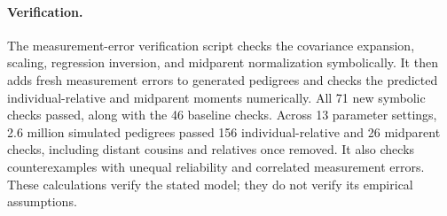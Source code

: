 \paragraph{Verification.}
The measurement-error verification script checks the covariance
expansion, scaling, regression inversion, and midparent normalization
symbolically. It then adds fresh measurement errors to generated
pedigrees and checks the predicted individual-relative and midparent
moments numerically. All 71 new symbolic checks passed, along with the 46 baseline checks. Across 13 parameter settings, 2.6 million simulated pedigrees passed 156 individual-relative and 26 midparent checks, including distant cousins and relatives once removed. It also checks counterexamples with unequal
reliability and correlated measurement errors. These calculations
verify the stated model; they do not verify its empirical assumptions.

